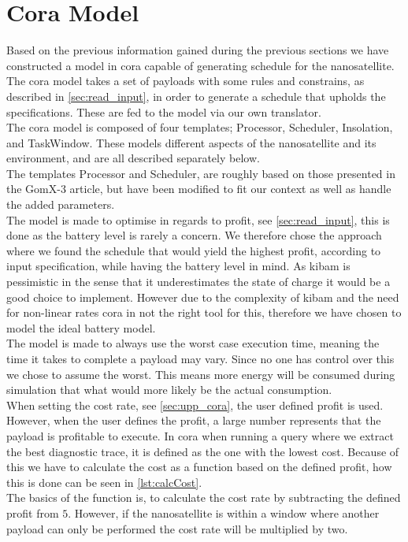 \section{Cora Model} \label{sec:cora}
Based on the previous information gained during the previous sections we have constructed a model in \gls{cora} capable of generating schedule for the nanosatellite. The \gls{cora} model takes a set of payloads with some rules and constrains, as described in \cref{sec:read_input}, in order to generate a schedule that upholds the specifications. These are fed to the model via our own translator.\\
The \gls{cora} model is composed of four templates; Processor, Scheduler, Insolation, and TaskWindow. These models different aspects of the nanosatellite and its environment, and are all described separately below.\\
The templates Processor and Scheduler, are roughly based on those presented in the GomX-3 article\cite{gomx3}, but have been modified to fit our context as well as handle the added parameters.\\
The model is made to optimise in regards to profit, see \cref{sec:read_input}, this is done as the battery level is rarely a concern\cite{gom_space_conversation}. We therefore chose the approach where we found the schedule that would yield the highest profit, according to input specification, while having the battery level in mind. As \gls{kibam} is pessimistic in the sense that it underestimates the state of charge it would be a good choice to implement. However due to the complexity of \gls{kibam} and the need for non-linear rates \gls{cora} in not the right tool for this, therefore we have chosen to model the ideal battery model.\\
The model is made to always use the worst case execution time, meaning the time it takes to complete a payload may vary. Since no one has control over this we chose to assume the worst. This means more energy will be consumed during simulation that what would more likely be the actual consumption.\\
When setting the cost rate, see \cref{sec:upp_cora}, the user defined profit is used. However, when the user defines the profit, a large number represents that the payload is profitable to execute. In \gls{cora} when running a query where we extract the best diagnostic trace, it is defined as the one with the lowest cost. Because of this we have to calculate the cost as a function based on the defined profit, how this is done can be seen in \cref{lst:calcCost}.\\
The basics of the function  is, to calculate the cost rate by subtracting the defined profit from $5$. However, if the nanosatellite is within a window where another payload can only be performed the cost rate will be multiplied by two.\\

